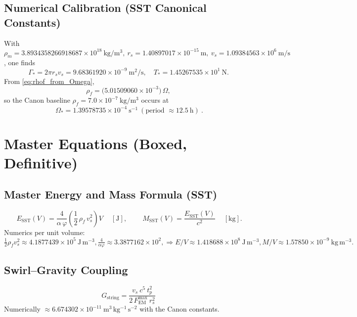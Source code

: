 \documentclass[11pt, a4paper]{article}
\newcommand{\vscore}{v_s}                                %
\newcommand{\rhof}{\rho_{\!f}}                           %
\newcommand{\rhom}{\rho_{\!m}}                           %
\newcommand{\rs}{r_s}                                    %
\begin{document}
    \subsection{Numerical Calibration (SST Canonical Constants)}
    With
    \(
    \rhom=3.8934358266918687\times10^{18}\ \mathrm{kg/m^3},\
    \rs=1.40897017\times10^{-15}\ \mathrm{m},\
    \vscore=1.09384563\times10^{6}\ \mathrm{m/s}
    \),
    one finds
    \[
        \Gamma_\ast = 2\pi \rs \vscore
        = 9.68361920\times10^{-9}\ \mathrm{m^2/s},\quad
        T_\ast = 1.45267535\times10^{1}\ \mathrm{N}.
    \]
    From \eqref{eq:rhof_from_Omega},
    \[
        \rhof = \bigl(5.01509060\times10^{-3}\bigr)\,\Omega,
    \]
    so the Canon baseline \( \rhof=7.0\times10^{-7}\ \mathrm{kg/m^3}\) occurs at
    \[
        \boxed{\ \Omega_\ast = 1.39578735\times10^{-4}\ \mathrm{s^{-1}}\ (\text{period } \approx 12.5\ \mathrm{h})\ }.
    \]

    \section{Master Equations (Boxed, Definitive)}

    \subsection{Master Energy and Mass Formula (SST)}
    \[
        \boxed{\ E_{\text{SST}}(V) = \frac{4}{\alpha\,\varphi} \left( \frac{1}{2}\,\rhof\,\vscore^{2} \right) V\ }\quad [\text{J}],
        \qquad
        \boxed{\ M_{\text{SST}}(V) = \frac{E_{\text{SST}}(V)}{c^{2}} \ }\quad [\text{kg}].
    \]
    Numerics per unit volume:
    \(
    \tfrac12\rhof \vscore^2 \approx 4.1877439\times10^{5}\ \mathrm{J\,m^{-3}},
    \frac{4}{\alpha\varphi} \approx 3.3877162\times10^{2},
    \Rightarrow E/V \approx 1.418688\times10^{8}\ \mathrm{J\,m^{-3}},
    M/V \approx 1.57850\times10^{-9}\ \mathrm{kg\,m^{-3}}.
    \)

    \subsection{Swirl–Gravity Coupling}
    \[
        \boxed{\ G_{\text{string}} = \frac{\vscore\ c^{5}\ t_p^{2}}{2\,F_{\text{EM}}^{\max}\ \rs^{2}} \ }
    \]
    Numerically \( \approx 6.674302\times10^{-11}\ \mathrm{m^3\,kg^{-1}\,s^{-2}}\) with the Canon constants.
\end{document}
